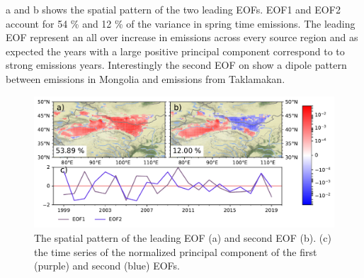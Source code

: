 a and b shows the spatial pattern of the two leading EOFs. EOF1 and EOF2 account for 54 \% and 12 \% of the variance in spring time emissions. The leading EOF represent an all over increase in emissions across every source region and as expected the years with a large positive principal component correspond to to strong emissions years. Interestingly the second EOF on show a dipole pattern between emissions in Mongolia and emissions from Taklamakan.    


\begin{figure}[htbp]
    \centering
    \includegraphics[width=\textwidth]{texfiles/figs/Emissions_EOF.pdf}
    \caption{The spatial pattern of the leading EOF (a) and second EOF (b). (c) the time series of the normalized principal component of the first (purple) and second (blue) EOFs.}
    \label{fig:emissions_eof}
\end{figure}



